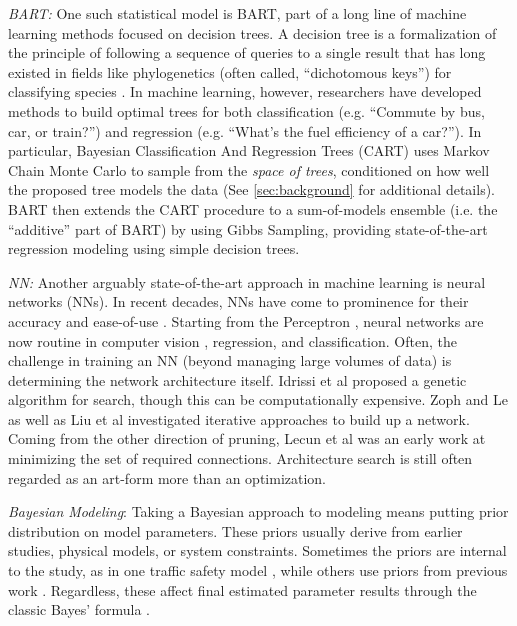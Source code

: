 \documentclass[12pt]{article}
\begin{document}
\emph{BART:} One such statistical model is BART, part of a long line of machine learning methods focused on decision trees.   A decision tree is a formalization of the principle of following a sequence of queries to a single result that has long existed in fields like phylogenetics (often called, ``dichotomous keys'') for classifying species \cite{pankhurst1991practical}.  In machine learning, however, researchers have developed methods to build optimal trees for both classification (e.g. ``Commute by bus, car, or train?'') and regression \cite{breiman1984classification} (e.g. ``What's the fuel efficiency of a car?'').  In particular, Bayesian Classification And Regression Trees (CART) \cite{chipman1998bayesian} uses Markov Chain Monte Carlo to sample from the \emph{space of trees}, conditioned on how well the proposed tree models the data (See \autoref{sec:background} for additional details).  BART \cite{chipman2010bart} then extends the CART procedure to a sum-of-models ensemble (i.e. the ``additive'' part of BART) by using Gibbs Sampling, providing state-of-the-art regression modeling using simple decision trees. 

\emph{NN:} Another arguably state-of-the-art approach in machine learning is neural networks (NNs).  In recent decades, NNs have come to prominence for their accuracy and ease-of-use \cite{schmidhuber2015deep}.  Starting from the Perceptron \cite{rosenblatt1958perceptron}, neural networks are now routine in computer vision \cite{tan2019efficientnet}, regression, and classification.  Often, the challenge in training an NN (beyond managing large volumes of data) is determining the network architecture itself.  Idrissi et al \cite{idrissi2016genetic} proposed a genetic algorithm for search, though this can be computationally expensive.  Zoph and Le \cite{zoph2016neural} as well as Liu et al \cite{liu2018progressive} investigated iterative approaches to build up a network.  Coming from the other direction of pruning, Lecun et al \cite{lecun1989optimal} was an early work at minimizing the set of required connections.  Architecture search is still often regarded as an art-form more than an optimization.

\emph{Bayesian Modeling}: Taking a Bayesian approach to modeling means putting prior distribution on model parameters.  These priors usually derive from earlier studies, physical models, or system constraints.  Sometimes the priors are internal to the study, as in one traffic safety model \cite{schneider2009bayesian}, while others use priors from previous work \cite{roman2022bayclump}.  Regardless, these affect final estimated parameter results through the classic Bayes' formula \cite{johnson2022bayes}.
\end{document}
